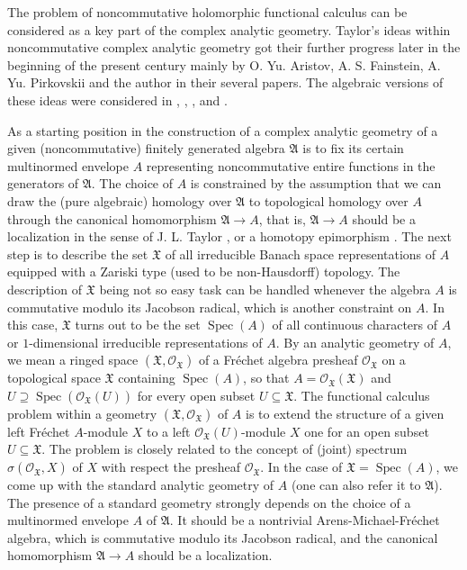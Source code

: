 \documentclass[12pt]{amsart}%
\theoremstyle{plain}
\numberwithin{equation}{section}
\numberwithin{equation}{section}
\numberwithin{theorem}{section}
\numberwithin{lemma}{section}
\numberwithin{remark}{section}
\numberwithin{example}{section}
\numberwithin{proposition}{section}
\numberwithin{definition}{section}
\numberwithin{corollary}{section}
\begin{document}
The problem of noncommutative holomorphic functional calculus can be
considered as a key part of the complex analytic geometry. Taylor's ideas
within noncommutative complex analytic geometry got their further progress
later in the beginning of the present century mainly by O. Yu. Aristov, A. S.
Fainstein, A. Yu. Pirkovskii and the author in their several papers. The
algebraic versions of these ideas were considered in \cite{DosiMMJ},
\cite{DosiTJM}, \cite{DosiBJMA24}, and \cite{DosiAA25}.

As a starting position in the construction of a complex analytic geometry of a
given (noncommutative) finitely generated algebra $\mathfrak{A}$ is to fix its
certain multinormed envelope $A$ representing noncommutative entire functions
in the generators of $\mathfrak{A}$. The choice of $A$ is constrained by the
assumption that we can draw the (pure algebraic) homology over $\mathfrak{A}$
to topological homology over $A$ through the canonical homomorphism
$\mathfrak{A}\rightarrow A$, that is, $\mathfrak{A}\rightarrow A$ should be a
localization in the sense of J. L. Taylor \cite{Tay2}, or a homotopy
epimorphism \cite{Oren}. The next step is to describe the set $\mathfrak{X}$
of all irreducible Banach space representations \cite[6.2]{Hel} of $A$
equipped with a Zariski type (used to be non-Hausdorff) topology. The
description of $\mathfrak{X}$ being not so easy task can be handled whenever
the algebra $A$ is commutative modulo its Jacobson radical, which is another
constraint on $A$. In this case, $\mathfrak{X}$ turns out to be the set
$\operatorname{Spec}\left(  A\right)  $ of all continuous characters of $A$ or
$1$-dimensional irreducible representations of $A$. By an analytic geometry of
$A$, we mean a ringed space $\left(  \mathfrak{X},\mathcal{O}_{\mathfrak{X}%
}\right)  $ of a Fr\'{e}chet algebra presheaf $\mathcal{O}_{\mathfrak{X}}$ on
a topological space $\mathfrak{X}$ containing $\operatorname{Spec}\left(
A\right)  $, so that $A=\mathcal{O}_{\mathfrak{X}}\left(  \mathfrak{X}\right)
$ and $U\supseteq\operatorname{Spec}\left(  \mathcal{O}_{\mathfrak{X}}\left(
U\right)  \right)  $ for every open subset $U\subseteq\mathfrak{X}$. The
functional calculus problem within a geometry $\left(  \mathfrak{X}%
,\mathcal{O}_{\mathfrak{X}}\right)  $ of $A$ is to extend the structure of a
given left Fr\'{e}chet $A$-module $X$ to a left $\mathcal{O}_{\mathfrak{X}%
}\left(  U\right)  $-module $X$ one for an open subset $U\subseteq
\mathfrak{X}$. The problem is closely related to the concept of (joint)
spectrum $\sigma\left(  \mathcal{O}_{\mathfrak{X}},X\right)  $ of $X$ with
respect the presheaf $\mathcal{O}_{\mathfrak{X}}$. In the case of
$\mathfrak{X=}\operatorname{Spec}\left(  A\right)  $, we come up with the
standard analytic geometry of $A$ (one can also refer it to $\mathfrak{A}$).
The presence of a standard geometry strongly depends on the choice of a
multinormed envelope $A$ of $\mathfrak{A}$. It should be a nontrivial
Arens-Michael-Fr\'{e}chet algebra, which is commutative modulo its Jacobson
radical, and the canonical homomorphism $\mathfrak{A}\rightarrow A$ should be
a localization.
\end{document}
